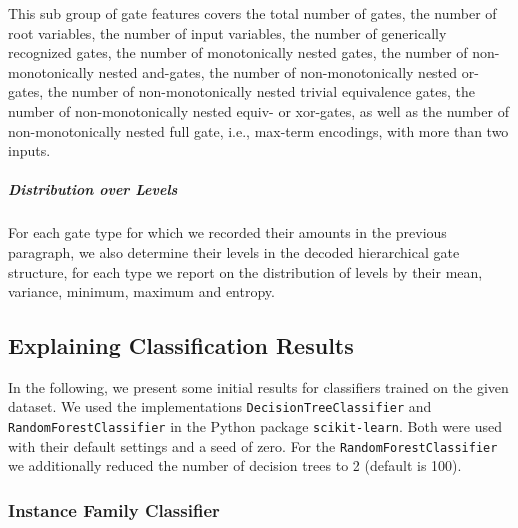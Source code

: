 \documentclass[a4paper, USenglish, cleveref, autoref, thm-restate]{lipics-v2021}
\theoremstyle{definition}
\begin{document}
This sub group of gate features covers the total number of gates, the number of root variables, the number of input variables, the number of generically recognized gates, the number of monotonically nested gates, the number of non-monotonically nested and-gates, the number of non-monotonically nested or-gates, the number of non-monotonically nested trivial equivalence gates, the number of non-monotonically nested equiv- or xor-gates, as well as the number of non-monotonically nested full gate, i.e., max-term encodings, with more than two inputs. 

\subparagraph{Distribution over Levels}

For each gate type for which we recorded their amounts in the previous paragraph, we also determine their levels in the decoded hierarchical gate structure, for each type we report on the distribution of levels by their \textsf{mean}, \textsf{variance}, \textsf{minimum}, \textsf{maximum} and \textsf{entropy}. 


\subsection{Explaining Classification Results}

In the following, we present some initial results for classifiers trained on the given dataset. 
We used the implementations \verb!DecisionTreeClassifier! and \verb!RandomForestClassifier! in the Python package \verb!scikit-learn!. 
Both were used with their default settings and a seed of zero. 
For the \verb!RandomForestClassifier! we additionally reduced the number of decision trees to 2 (default is 100). 

\subsubsection{Instance Family Classifier}
\end{document}

